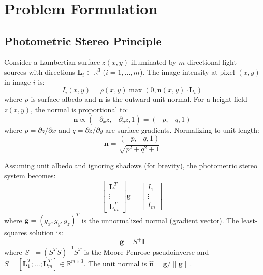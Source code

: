 \documentclass[11pt]{article}
\begin{document}
\section{Problem Formulation}\label{sec:formulation}

\subsection{Photometric Stereo Principle}

Consider a Lambertian surface $z(x,y)$ illuminated by $m$ directional light sources with directions $\mathbf{L}_i \in \mathbb{R}^3$ ($i=1,\ldots,m$). The image intensity at pixel $(x,y)$ in image $i$ is:
\begin{equation}
I_i(x,y) = \rho(x,y) \max(0, \mathbf{n}(x,y) \cdot \mathbf{L}_i)
\end{equation}
where $\rho$ is surface albedo and $\mathbf{n}$ is the outward unit normal.
\newline\newline For a height field $z(x,y)$, the normal is proportional to:
\begin{equation}
\mathbf{n} \propto (-\partial_x z, -\partial_y z, 1) = (-p, -q, 1)
\end{equation}
where $p = \partial z/\partial x$ and $q = \partial z/\partial y$ are surface gradients. Normalizing to unit length:
\begin{equation}
\mathbf{n} = \frac{(-p, -q, 1)}{\sqrt{p^2 + q^2 + 1}}
\end{equation}

Assuming unit albedo and ignoring shadows (for brevity), the photometric stereo system becomes:
\begin{equation}
\begin{bmatrix}
\mathbf{L}_1^T \\
\vdots \\
\mathbf{L}_m^T
\end{bmatrix} \mathbf{g} = \begin{bmatrix}
I_1 \\
\vdots \\
I_m
\end{bmatrix}
\end{equation}
where $\mathbf{g} = (g_x, g_y, g_z)^T$ is the unnormalized normal (gradient vector). The least-squares solution is:
\begin{equation}
\mathbf{g} = S^+ \mathbf{I}
\end{equation}
where $S^+ = (S^T S)^{-1} S^T$ is the Moore-Penrose pseudoinverse and $S = [\mathbf{L}_1^T; \ldots; \mathbf{L}_m^T] \in \mathbb{R}^{m \times 3}$. The unit normal is $\hat{\mathbf{n}} = \mathbf{g}/\|\mathbf{g}\|$.
\end{document}
